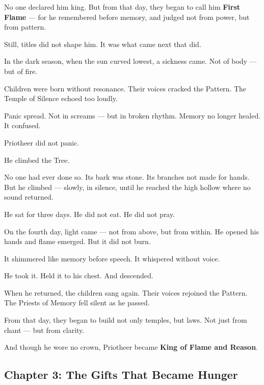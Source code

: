 \documentclass[9pt]{article}
\begin{document}
No one declared him king.  
But from that day, they began to call him \textbf{First Flame} —  
for he remembered before memory,  
and judged not from power, but from pattern.

Still, titles did not shape him.  
It was what came next that did.

In the dark season, when the sun curved lowest, a sickness came.  
Not of body — but of fire.

Children were born without resonance.  
Their voices cracked the Pattern.  
The Temple of Silence echoed too loudly.

Panic spread.  
Not in screams — but in broken rhythm.  
Memory no longer healed. It confused.

Priotheer did not panic.

He climbed the Tree.

No one had ever done so.  
Its bark was stone. Its branches not made for hands.  
But he climbed — slowly, in silence, until he reached the high hollow where no sound returned.

He sat for three days.  
He did not eat.  
He did not pray.

On the fourth day, light came — not from above, but from within.  
He opened his hands and flame emerged.  
But it did not burn.

It shimmered like memory before speech.  
It whispered without voice.

He took it.  
Held it to his chest.  
And descended.

When he returned, the children sang again.  
Their voices rejoined the Pattern.  
The Priests of Memory fell silent as he passed.

From that day, they began to build not only temples, but laws.  
Not just from chant — but from clarity.

And though he wore no crown, Priotheer became  
\textbf{King of Flame and Reason}.

\newpage

\subsection*{Chapter 3: The Gifts That Became Hunger}

\vspace{1in}
\end{document}

